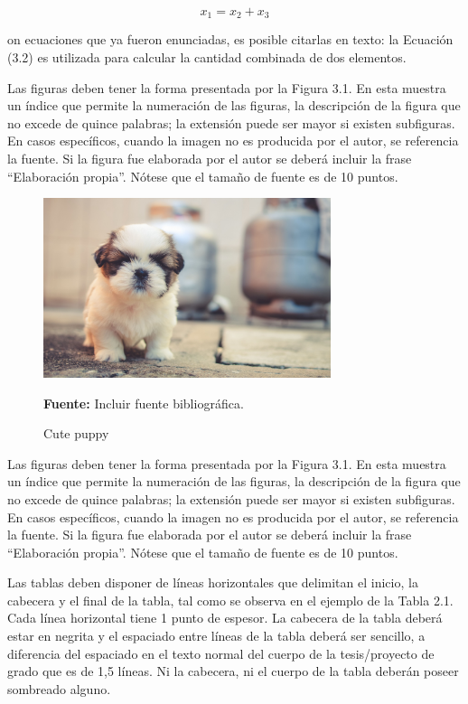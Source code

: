 \begin{equation}
	x_1 = x_2 + x_3
\end{equation}

on ecuaciones que ya fueron enunciadas, es posible citarlas en texto: la Ecuación (3.2) es utilizada para calcular la cantidad combinada de dos elementos.

Las figuras deben tener la forma presentada por la Figura 3.1. En esta muestra un índice que permite la numeración de las figuras, la descripción de la figura que no excede de quince palabras; la extensión puede ser mayor si existen subfiguras. En casos específicos, cuando la imagen no es producida por el autor, se referencia la fuente. Si la figura fue elaborada por el autor se deberá incluir la frase “Elaboración propia”. Nótese que el tamaño de fuente es de 10 puntos.

\begin{figure}
	\centering
	\includegraphics[width=0.75\textwidth]{images/puppy_dog_cute.jpg}
	\caption{Cute puppy} \vspace{-0.2cm}
	\footnotesize{\textbf{Fuente:} Incluir fuente bibliográfica.}
	\label{pics:Puppy} 
\end{figure}


Las figuras deben tener la forma presentada por la Figura 3.1. En esta muestra un índice que permite la numeración de las figuras, la descripción de la figura que no excede de quince palabras; la extensión puede ser mayor si existen subfiguras. En casos específicos, cuando la imagen no es producida por el autor, se referencia la fuente. Si la figura fue elaborada por el autor se deberá incluir la frase “Elaboración propia”. Nótese que el tamaño de fuente es de 10 puntos.

Las tablas deben disponer de líneas horizontales que delimitan el inicio, la cabecera y el final de la tabla, tal como se observa en el ejemplo de la Tabla 2.1. Cada línea horizontal tiene 1 punto de espesor. La cabecera de la tabla deberá estar en negrita y el espaciado entre líneas de la tabla deberá ser sencillo, a diferencia del espaciado en el texto normal del cuerpo de la tesis/proyecto de grado que es de 1,5 líneas. Ni la cabecera, ni el cuerpo de la tabla deberán poseer sombreado alguno.

